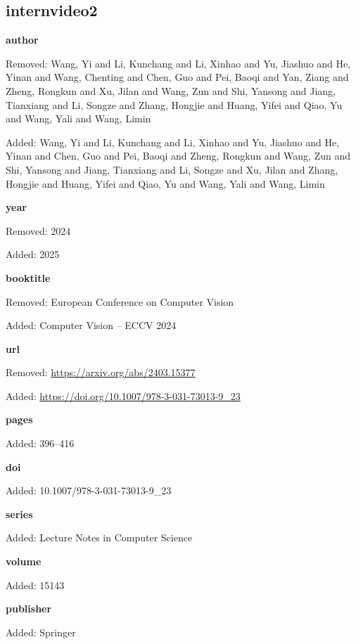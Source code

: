 \subsection*{internvideo2}
\noindent\textbf{author}\par
{\color{AuditRed}Removed: Wang, Yi and Li, Kunchang and Li, Xinhao and Yu, Jiashuo and He, Yinan and Wang, Chenting and Chen, Guo and Pei, Baoqi and Yan, Ziang and Zheng, Rongkun and Xu, Jilan and Wang, Zun and Shi, Yansong and Jiang, Tianxiang and Li, Songze and Zhang, Hongjie and Huang, Yifei and Qiao, Yu and Wang, Yali and Wang, Limin\par}
{\color{AuditGreen}Added: Wang, Yi and Li, Kunchang and Li, Xinhao and Yu, Jiashuo and He, Yinan and Chen, Guo and Pei, Baoqi and Zheng, Rongkun and Wang, Zun and Shi, Yansong and Jiang, Tianxiang and Li, Songze and Xu, Jilan and Zhang, Hongjie and Huang, Yifei and Qiao, Yu and Wang, Yali and Wang, Limin\par}
\noindent\textbf{year}\par
{\color{AuditRed}Removed: 2024\par}
{\color{AuditGreen}Added: 2025\par}
\noindent\textbf{booktitle}\par
{\color{AuditRed}Removed: European Conference on Computer Vision\par}
{\color{AuditGreen}Added: Computer Vision – ECCV 2024\par}
\noindent\textbf{url}\par
{\color{AuditRed}Removed: \url{https://arxiv.org/abs/2403.15377}\par}
{\color{AuditGreen}Added: \url{https://doi.org/10.1007/978-3-031-73013-9_23}\par}
\noindent\textbf{pages}\par
{\color{AuditGreen}Added: 396–416\par}
\noindent\textbf{doi}\par
{\color{AuditGreen}Added: 10.1007/978-3-031-73013-9\_23\par}
\noindent\textbf{series}\par
{\color{AuditGreen}Added: Lecture Notes in Computer Science\par}
\noindent\textbf{volume}\par
{\color{AuditGreen}Added: 15143\par}
\noindent\textbf{publisher}\par
{\color{AuditGreen}Added: Springer\par}
\medskip

